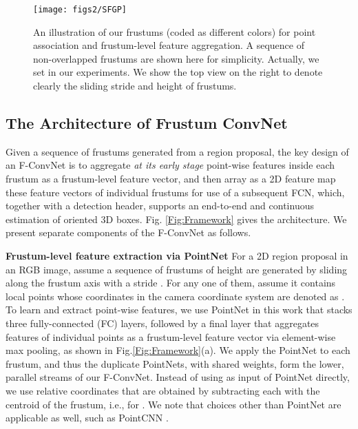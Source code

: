 \documentclass[letterpaper, 10 pt, conference]{ieeeconf}
\begin{document}
\begin{figure}
	\begin{center}
	\texttt{[image: figs2/SFGP]}
	\caption[]{An illustration of our frustums (coded as different colors) for point association and frustum-level feature aggregation. A sequence of non-overlapped frustums are shown here for simplicity. Actually, we set  in our experiments. We show the top view on the right to denote clearly the sliding stride  and height  of frustums.  }
	\label{Fig:SFGP}
	\end{center}
	\vspace{-0.5cm}
\end{figure}
\subsection{The Architecture of Frustum ConvNet}

Given a sequence of frustums generated from a region proposal, the key design of an F-ConvNet is to aggregate \emph{at its early stage} point-wise features inside each frustum as a frustum-level feature vector, and then array as a 2D feature map these feature vectors of individual frustums for use of a subsequent FCN, which, together with a detection header, supports an end-to-end and continuous estimation of oriented 3D boxes. Fig. \ref{Fig:Framework} gives the architecture. We present separate components of the F-ConvNet as follows.

\vspace{0.1cm}
\noindent\textbf{Frustum-level feature extraction via PointNet}
For a 2D region proposal in an RGB image, assume a sequence of  frustums of height  are generated by sliding along the frustum axis with a stride . For any one of them, assume it contains  local points whose coordinates in the camera coordinate system are denoted as . To learn and extract point-wise features, we use PointNet\cite{qi2017pointnet} in this work that stacks three fully-connected (FC) layers, followed by a final layer that aggregates features of individual points as a frustum-level feature vector via element-wise max pooling, as shown in Fig.\ref{Fig:Framework}(a).  We apply the PointNet to each frustum, and thus the  duplicate PointNets, with shared weights, form the lower, parallel streams of our F-ConvNet. Instead of using  as input of PointNet directly, we use relative coordinates  that are obtained by subtracting each  with the centroid  of the frustum, i.e.,  for . We note that choices other than PointNet are applicable as well, such as PointCNN \cite{li2018pointcnn}.
\end{document}

